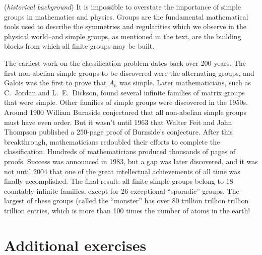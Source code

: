 \begin{rem} (\emph{historical background})  It is impossible to overstate the importance of simple groups in mathematics and physics. 
Groups are the fundamental mathematical tools used to describe the symmetries and regularities which we observe in the physical world--and simple groups, as mentioned in the text, are the building blocks from which all finite groups may be built.

The earliest work on the classification problem dates back over 200 years.  The first non-abelian simple groups to be discovered were the alternating groups, and Galois was the first to prove that $A_5$ was
simple. Later mathematicians, such as C.~Jordan and
L.~E.~Dickson, found several infinite families of
matrix groups that were simple. Other families of simple groups were
discovered in the 1950s.  Around 1900 William
Burnside conjectured that all non-abelian
simple groups must have even order. But it wasn't until 1963 that
 Walter Feit and John Thompson published a 250-page  proof of Burnside's conjecture.
After this breakthrough, mathematicians redoubled their efforts to complete the classification. Hundreds of mathematicians produced thousands of pages of proofs. Success was announced in 1983, but a gap was later discovered, and it was not until 2004 that one of the great intellectual achievements of all time was finally accomplished. The final result:  all finite simple groups belong to 18 countably infinite families, except for 26 exceptional ``sporadic'' groups.  The largest of these groups (called the ``monster'' has over 80 trillion trillion trillion trillion entries, which is more than 100 times the number of atoms in the earth!
\end{rem} 
 
\section*{Additional exercises}
\label{sec:Cosets:AdditionalExercises}


